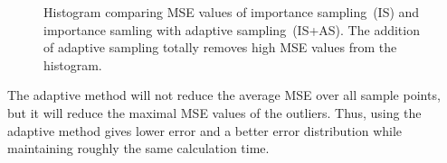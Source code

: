 \begin{figure}[H]
  \centerline{
    }
  \caption{Histogram comparing MSE values of importance sampling~(IS)
    and importance samling with adaptive sampling~(IS+AS).  The
    addition of adaptive sampling totally removes high MSE values from
    the histogram.}
  \label{plot:adaptive}
\end{figure}
The adaptive method will not reduce the average MSE over all sample points,
but it will reduce the maximal MSE values of the outliers. Thus, using the adaptive
method gives lower error and a better error distribution while maintaining
roughly the same calculation time.


